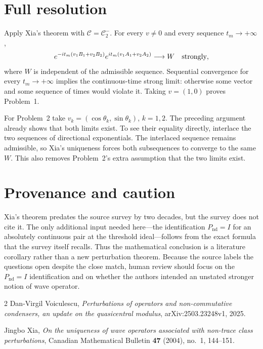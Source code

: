 \documentclass[11pt]{article}
\begin{document}
\section*{Full resolution}

Apply Xia's theorem with $\mathcal C=\mathcal C_2^-$. For every $v\ne0$ and
every sequence $t_m\to+\infty$,
\[
 e^{-it_m(v_1B_1+v_2B_2)}
 e^{it_m(v_1A_1+v_2A_2)}
 \longrightarrow W
\quad\hbox{strongly},
\]
where \(W\) is independent of the admissible sequence. Sequential convergence
for every \(t_m\to+\infty\) implies the continuous-time strong limit:
otherwise some vector and some sequence of times would violate it. Taking
\(v=(1,0)\) proves Problem~1.

For Problem~2 take
$v_k=(\cos\theta_k,\sin\theta_k)$, \(k=1,2\). The preceding argument already
shows that both limits exist. To see their equality directly, interlace the
two sequences of directional exponentials. The interlaced sequence remains
admissible, so Xia's uniqueness forces both subsequences to converge to the
same \(W\). This also removes Problem~2's extra assumption that the two limits
exist.

\section*{Provenance and caution}

Xia's theorem predates the source survey by two decades, but the survey does
not cite it. The only additional input needed here---the identification
$P_{\mathrm{nd}}=I$ for an absolutely continuous pair at the threshold
ideal---follows from the exact formula that the survey itself recalls. Thus
the mathematical conclusion is a literature corollary rather than a new
perturbation theorem. Because the source labels the questions open despite
the close match, human review should focus on the
$P_{\mathrm{nd}}=I$ identification and on whether the authors intended an
unstated stronger notion of wave operator.

\begin{thebibliography}{2}
Dan-Virgil Voiculescu,
\emph{Perturbations of operators and non-commutative condensers, an update on
the quasicentral modulus},
arXiv:2503.23248v1, 2025.

Jingbo Xia,
\emph{On the uniqueness of wave operators associated with non-trace class
perturbations},
Canadian Mathematical Bulletin \textbf{47} (2004), no.~1, 144--151.
\end{thebibliography}
\end{document}
